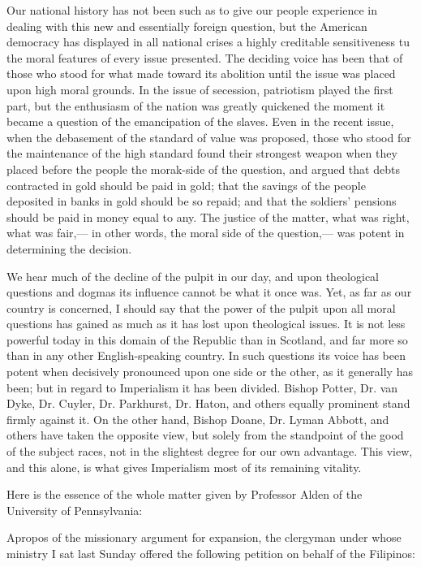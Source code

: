 \documentclass[11pt,openany]{book}
\begin{document}
Our national history has not been such as to give our people experience in dealing with this new and essentially foreign question, but the American democracy has displayed in all national crises a highly creditable sensitiveness tu the moral features of every issue presented. The deciding voice has been that of those who stood for what made toward its abolition until the issue was placed upon high moral grounds. In the issue of secession, patriotism played the first part, but the enthusiasm of the nation was greatly quickened the moment it became a question of the emancipation of the slaves. Even in the recent issue, when the debasement of the standard of value was proposed, those who stood for the maintenance of the high standard found their strongest weapon when they placed before the people the morak-side of the question, and argued that debts contracted in gold should be paid in gold; that the savings of the people deposited in banks in gold should be so repaid; and that the soldiers' pensions should be paid in money equal to any. The justice of the matter, what was right, what was fair,--- in other words, the moral side of the question,--- was potent in determining the decision.

We hear much of the decline of the pulpit in our day, and upon theological questions and dogmas its influence cannot be what it once was. Yet, as far as our country is concerned, I should say that the power of the pulpit upon all moral questions has gained as much as it has lost upon theological issues. It is not less powerful today in this domain of the Republic than in Scotland, and far more so than in any other English-speaking country. In such questions its voice has been potent when decisively pronounced upon one side or the other, as it generally has been; but in regard to Imperialism it has been divided. Bishop Potter, Dr. van Dyke, Dr. Cuyler, Dr. Parkhurst, Dr. Haton, and others equally prominent stand firmly against it. On the other hand, Bishop Doane, Dr. Lyman Abbott, and others have taken the opposite view, but solely from the standpoint of the good of the subject races, not in the slightest degree for our own advantage. This view, and this alone, is what gives Imperialism most of its remaining vitality.

Here is the essence of the whole matter given by Professor Alden of the University of Pennsylvania:

Apropos of the missionary argument for expansion, the clergyman under whose ministry I sat last Sunday offered the following petition on behalf of the Filipinos:
\end{document}
